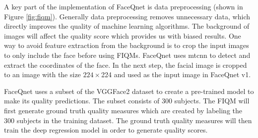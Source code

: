 A key part of the implementation of FaceQnet is data preprocessing (shown in Figure \ref{fig:fiqm}). Generally data preprocessing removes unnecessary data, which directly improves the quality of machine learning algorithms. The background of images will affect the quality score which provides us with biased results. One way to avoid feature extraction from the background is to crop the input images to only include the face before using FIQMs. FaceQnet uses \acrfull{mtcnn} to detect and extract the coordinates of the face. In the next step, the facial image is cropped to an image with the size $224 \times $224 and used as the input image in FaceQnet v1. 

FaceQnet uses a subset of the VGGFace2 \cite{VGGFace2} dataset to create a pre-trained model to make its quality predictions. The subset consists of 300 subjects. The FIQM will first generate ground truth quality measures which are created by labeling the 300 subjects in the training dataset. The ground truth quality measures will then train the deep regression model in order to generate quality scores. 

